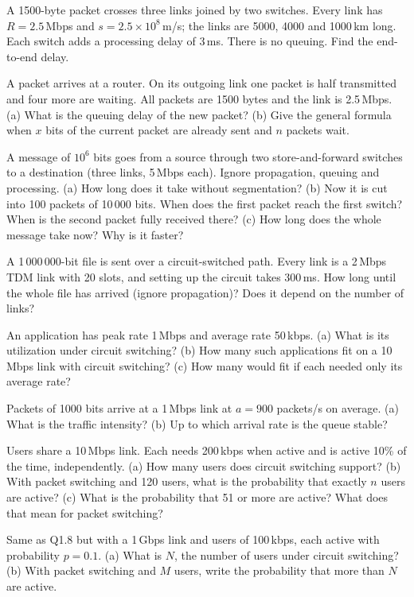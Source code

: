 A 1500-byte packet crosses three links joined by two switches. Every link has $R=2.5$\,Mbps and $s=2.5\times10^8$\,m/s; the links are 5000, 4000 and 1000\,km long.
Each switch adds a processing delay of 3\,ms. There is no queuing. Find the end-to-end delay.

A packet arrives at a router. On its outgoing link one packet is half transmitted and four more are waiting. All packets are 1500 bytes and the link is 2.5\,Mbps.
(a) What is the queuing delay of the new packet? (b) Give the general formula when $x$ bits of the current packet are already sent and $n$ packets wait.

A message of $10^6$ bits goes from a source through two store-and-forward switches to a destination (three links, 5\,Mbps each). Ignore propagation, queuing and processing.
(a) How long does it take without segmentation?
(b) Now it is cut into 100 packets of 10\,000 bits. When does the first packet reach the first switch? When is the second packet fully received there?
(c) How long does the whole message take now? Why is it faster?

A 1\,000\,000-bit file is sent over a circuit-switched path. Every link is a 2\,Mbps TDM link with 20 slots, and setting up the circuit takes 300\,ms.
How long until the whole file has arrived (ignore propagation)? Does it depend on the number of links?

An application has peak rate 1\,Mbps and average rate 50\,kbps. (a) What is its utilization under circuit switching? (b) How many such applications fit on a 10\,Mbps link
with circuit switching? (c) How many would fit if each needed only its average rate?

Packets of 1000 bits arrive at a 1\,Mbps link at $a=900$ packets/s on average. (a) What is the traffic intensity? (b) Up to which arrival rate is the queue stable?

Users share a 10\,Mbps link. Each needs 200\,kbps when active and is active 10\% of the time, independently.
(a) How many users does circuit switching support?
(b) With packet switching and 120 users, what is the probability that exactly $n$ users are active?
(c) What is the probability that 51 or more are active? What does that mean for packet switching?

Same as Q1.8 but with a 1\,Gbps link and users of 100\,kbps, each active with probability $p=0.1$.
(a) What is $N$, the number of users under circuit switching? (b) With packet switching and $M$ users, write the probability that more than $N$ are active.

